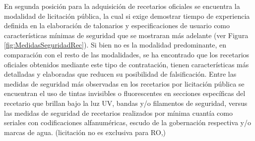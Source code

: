 \documentclass[
]{book}
\begin{document}
En segunda posición para la adquisición de recetarios oficiales se encuentra la modalidad de licitación pública, la cual si exige demostrar tiempo de experiencia definida en la elaboración de talonarios y especificaciones de usuario como características mínimas de seguridad que se mostraran más adelante (ver Figura \ref{fig:MedidasSeguridadRec}). Si bien no es la modalidad predominante, en comparación con el resto de las modalidades, se ha encontrado que los recetarios oficiales obtenidos mediante este tipo de contratación, tienen características más detalladas y elaboradas que reducen su posibilidad de falsificación. Entre las medidas de seguridad más observadas en los recetarios por licitación pública se encuentran el uso de tintas invisibles o fluorescentes en secciones específicas del recetario que brillan bajo la luz UV, bandas y/o filamentos de seguridad, versus las medidas de seguridad de recetarios realizados por mínima cuantía como seriales con codificaciones alfanuméricas, escudo de la gobernación respectiva y/o marcas de agua. (licitación no es exclusiva para RO,)
\end{document}
